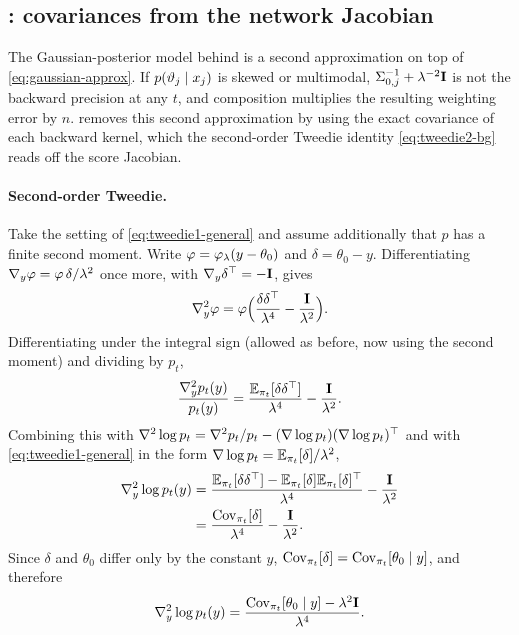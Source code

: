 \subsection{\quiver: covariances from the network Jacobian}\label{sec:quiver}

The Gaussian-posterior model behind \arrowm{} is a second approximation on top of \cref{eq:gaussian-approx}.
If $p(\vartheta_j\mid x_j)$ is skewed or multimodal, $\Sigma_{0,j}^{-1}+\lambda^{-2}\mathbf{I}$ is not the backward precision at any $t$, and composition multiplies the resulting weighting error by $n$.
\quiver{} removes this second approximation by using the exact covariance of each backward kernel, which the second-order Tweedie identity \cref{eq:tweedie2-bg} reads off the score Jacobian.

\paragraph{Second-order Tweedie.}
Take the setting of \cref{eq:tweedie1-general} and assume additionally that $p$ has a finite second moment.
Write $\varphi=\varphi_\lambda(y-\theta_0)$ and $\delta=\theta_0-y$.
Differentiating $\nabla_y\varphi=\varphi\,\delta/\lambda^2$ once more, with $\nabla_y\delta^\top=-\mathbf{I}$, gives
\[
  \nabla_y^2\varphi=\varphi\Big(\frac{\delta\delta^\top}{\lambda^4}-\frac{\mathbf{I}}{\lambda^2}\Big).
\]
Differentiating under the integral sign (allowed as before, now using the second moment) and dividing by $p_t$,
\[
  \frac{\nabla_y^2p_t(y)}{p_t(y)}=\frac{\mathbb{E}_{\pi_t}[\delta\delta^\top]}{\lambda^4}-\frac{\mathbf{I}}{\lambda^2}.
\]
Combining this with $\nabla^2\log p_t=\nabla^2p_t/p_t-(\nabla\log p_t)(\nabla\log p_t)^\top$ and with \cref{eq:tweedie1-general} in the form $\nabla\log p_t=\mathbb{E}_{\pi_t}[\delta]/\lambda^2$,
\[
\begin{aligned}
  \nabla_y^2\log p_t(y)&=\frac{\mathbb{E}_{\pi_t}[\delta\delta^\top]-\mathbb{E}_{\pi_t}[\delta]\mathbb{E}_{\pi_t}[\delta]^\top}{\lambda^4}-\frac{\mathbf{I}}{\lambda^2}\\
  &=\frac{\operatorname{Cov}_{\pi_t}[\delta]}{\lambda^4}-\frac{\mathbf{I}}{\lambda^2}.
\end{aligned}
\]
Since $\delta$ and $\theta_0$ differ only by the constant $y$, $\operatorname{Cov}_{\pi_t}[\delta]=\operatorname{Cov}_{\pi_t}[\theta_0\mid y]$, and therefore
\begin{equation}\label{eq:tweedie2}
  \nabla_y^2\log p_t(y)=\frac{\operatorname{Cov}_{\pi_t}[\theta_0\mid y]-\lambda^2\mathbf{I}}{\lambda^4}.
\end{equation}

